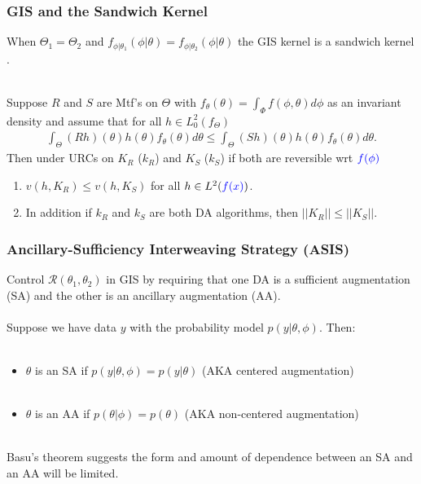 \documentclass[xcolor=dvipsnames]{beamer}
\begin{document}
\begin{frame}
\frametitle{GIS and the Sandwich Kernel}

When $\Theta_1=\Theta_2$ and $f_{\phi|\theta_1}(\phi|\theta)=f_{\phi|\theta_2}(\phi|\theta)$ the GIS kernel is a sandwich kernel \citep{hobert2008theoretical,hobert2011comment}.\\~\\

\begin{theorem}
Suppose $R$ and $S$ are Mtf's on $\Theta$ with $f_\theta(\theta)=\int_\Phi f(\phi,\theta)d\phi$ as an invariant density and assume that for all $h\in L^2_0(f_\Theta)$
\begin{align*}
\int_{\Theta}(Rh)(\theta)h(\theta)f_\theta(\theta)d\theta \leq \int_{\Theta}(Sh)(\theta)h(\theta)f_\theta(\theta)d\theta.
\end{align*}
Then under URCs on $K_R$ ($k_R$) and $K_S$ ($k_S$) if both are reversible wrt ${\color{blue}f(\phi)}$ 
\begin{enumerate}
\item $v(h,K_R)\leq v(h,K_S)$ for all $h\in L^2({\color{blue}f(x)})$.
\item In addition if $k_R$ and $k_S$ are both DA algorithms, then $||K_R||\leq ||K_S||$.
\end{enumerate}
\end{theorem}

\end{frame}


\begin{frame}
\frametitle{Ancillary-Sufficiency Interweaving Strategy (ASIS)} 

Control $\mathcal{R}(\theta_1,\theta_2)$ in GIS by requiring that one DA is a sufficient augmentation (SA) and the other is an ancillary augmentation (AA).\\~\\

Suppose we have data $y$ with the probability model $p(y|\theta,\phi)$. Then:\\~
\begin{itemize}
\item$\theta$ is an SA if $p(y|\theta,\phi)=p(y|\theta)$ (AKA centered augmentation)\\~\\
\item$\theta$ is an AA if $p(\theta|\phi)=p(\theta)$ (AKA non-centered augmentation)\\~\\
\end{itemize}
\pause Basu's theorem suggests the form and amount of dependence between an SA and an AA will be limited.
\end{frame}
\end{document}

